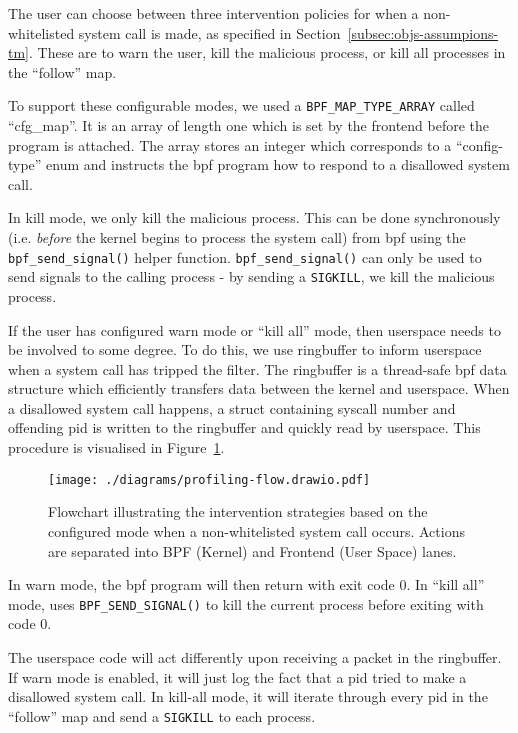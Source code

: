 The user can choose between three intervention policies for when a
non-whitelisted system call is made, as specified in 
Section~\ref{subsec:objs-assumpions-tm}. These are to warn the user, kill the
malicious process, or kill all processes in the ``follow'' map.

To support these configurable modes, we used a \texttt{BPF\_MAP\_TYPE\_ARRAY}
called ``cfg\_map''. It is an array of length one which is set by the frontend
before the program is attached. The array stores an integer which corresponds to
a ``config-type'' enum and instructs the \ac{bpf} program how to respond to a
disallowed system call.

In kill mode, we only kill the malicious process. This can be done synchronously
(i.e. \textit{before} the kernel begins to process the system call) from \ac{bpf}
using the \texttt{bpf\_send\_signal()} helper function. 
\texttt{bpf\_send\_signal()} can only be used to send signals to the calling
process - by sending a \texttt{SIGKILL}, we kill the malicious process.

If the user has configured warn mode or ``kill all'' mode, then userspace needs
to be involved to some degree. To do this, we use  ringbuffer to inform
userspace when a system call has tripped the filter. The ringbuffer is a thread-safe
\ac{bpf} data structure which efficiently transfers data between the kernel and
userspace. When a disallowed system call happens, a struct containing syscall
number and offending \ac{pid} is written to the ringbuffer and quickly read by
userspace. This procedure is visualised in Figure~\ref{fig:intervention-flowchart}.

\begin{figure}[h]
\centering
\texttt{[image: ./diagrams/profiling-flow.drawio.pdf]} 
\caption{Flowchart illustrating the intervention strategies based on the
configured mode when a non-whitelisted system call occurs. Actions are separated
into BPF (Kernel) and Frontend (User Space) lanes.}
\label{fig:intervention-flowchart}
\end{figure}

In warn mode, the \ac{bpf} program will then return with exit code 0. In ``kill
all'' mode, \af uses \texttt{BPF\_SEND\_SIGNAL()} to kill the current process
before exiting with code 0.

The userspace code will act differently upon receiving a packet in the
ringbuffer. If warn mode is enabled, it will just log the fact that a \ac{pid}
tried to make a disallowed system call. In kill-all mode, it will iterate through
every \ac{pid} in the ``follow'' map and send a \texttt{SIGKILL} to each
process.

